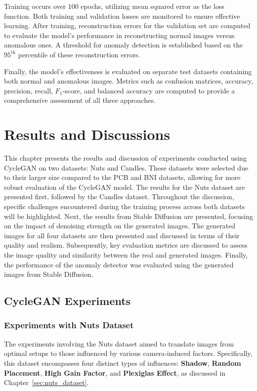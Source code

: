\documentclass[12pt,DIV14,BCOR12mm,a4paper,footinclude=false,headinclude,parskip=half-,twoside,openright,cleardoublepage=empty,toc=index,bibliography=totoc,listof=totoc]{scrreprt}
\numberwithin{equation}{chapter}
\begin{document}
Training occurs over $100$ epochs, utilizing mean squared error as the loss function. Both training and validation losses are monitored to ensure effective learning. After training, reconstruction errors for the validation set are computed to evaluate the model's performance in reconstructing normal images versus anomalous ones. A threshold for anomaly detection is established based on the $95^{\text{th}}$ percentile of these reconstruction errors.

Finally, the model's effectiveness is evaluated on separate test datasets containing both normal and anomalous images. Metrics such as confusion matrices, accuracy, precision, recall, \( F_1 \)-score, and balanced accuracy are computed to provide a comprehensive assessment of all three approaches.

\chapter{Results and Discussions}
\label{chapter4}
This chapter presents the results and discussion of experiments conducted using CycleGAN on two datasets: Nuts and Candles. These datasets were selected due to their larger size compared to the PCB and BNI datasets, allowing for more robust evaluation of the CycleGAN model. The results for the Nuts dataset are presented first, followed by the Candles dataset. Throughout the discussion, specific challenges encountered during the training process across both datasets will be highlighted. Next, the results from Stable Diffusion are presented, focusing on the impact of denoising strength on the generated images. The generated images for all four datasets are then presented and discussed in terms of their quality and realism. Subsequently, key evaluation metrics are discussed to assess the image quality and similarity between the real and generated images. Finally, the performance of the anomaly detector was evaluated using the generated images from Stable Diffusion.
\section{CycleGAN Experiments}

\subsection{Experiments with Nuts Dataset}
\label{sec:cyclegan_nuts}
The experiments involving the Nuts dataset aimed to translate images from optimal setups to those influenced by various camera-induced factors. Specifically, this dataset encompasses four distinct types of influences: \textbf{Shadow}, \textbf{Random Placement}, \textbf{High Gain Factor}, and \textbf{Plexiglas Effect}, as discussed in Chapter~\ref{sec:nuts_dataset}.
\end{document}
